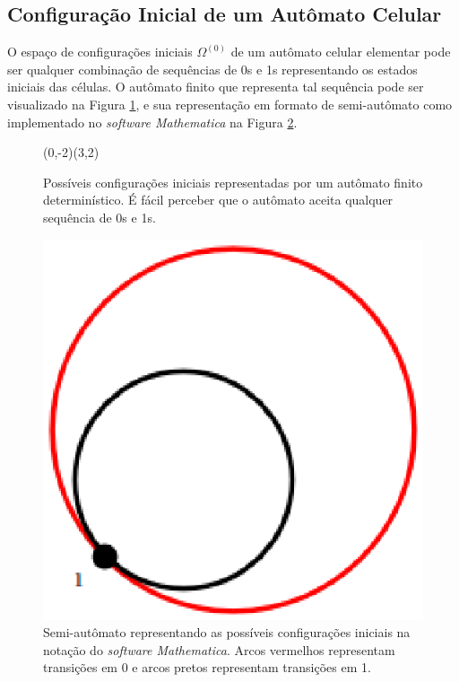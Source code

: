 \documentclass[12pt,a4paper]{article}
\begin{document}
\subsection{Configuração Inicial de um Autômato Celular}

O espaço de configurações iniciais $\Omega^{(0)}$ de um autômato celular
elementar pode ser qualquer combinação de sequências de 0s e 1s
representando os estados iniciais das células. O autômato finito
que representa tal sequência pode ser visualizado na Figura
\ref{fig:initconfigautomaton}, e sua representação em formato de
semi-autômato como implementado no \textit{software Mathematica}
na Figura \ref{fig:initconfigmathematica}.

\begin{figure}[htp]
\begin{center}
\begin{VCPicture}{(0,-2)(3,2)}
\end{VCPicture}
\caption{Possíveis configurações iniciais representadas por um autômato finito
determinístico. É fácil perceber que o autômato aceita qualquer sequência de
0s e 1s.}
\label{fig:initconfigautomaton}
\end{center}
\end{figure}

\begin{figure}[htp]
\begin{center}
\includegraphics[scale=0.3]{img/InitialConfig.eps}
\caption{Semi-autômato representando as possíveis configurações iniciais
na notação do \textit{software Mathematica}. Arcos vermelhos representam
transições em 0 e arcos pretos representam transições em 1.}
\label{fig:initconfigmathematica}
\end{center}
\end{figure}
\end{document}
